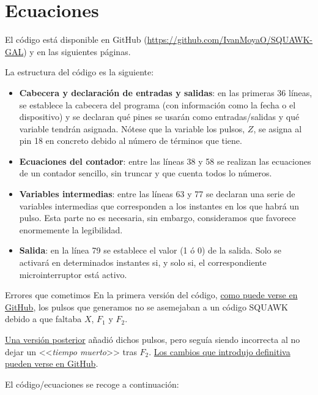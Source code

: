 \section*{Ecuaciones}
El código está disponible en GitHub (\textcolor{blue}{\href{https://github.com/IvanMoyaO/SQUAWK-GAL}{https://github.com/IvanMoyaO/SQUAWK-GAL}}) y en las siguientes páginas. 

La estructura del código es la siguiente:
\begin{itemize}
    \item \textbf{Cabecera y declaración de entradas y salidas}: en las primeras 36 líneas, se establece la cabecera del programa (con información como la fecha o el dispositivo) y se declaran qué pines se usarán como entradas/salidas y qué variable tendrán asignada. Nótese que la variable los pulsos, $Z$, se asigna al pin 18 en concreto debido al número de términos que tiene.
    \item \textbf{Ecuaciones del contador}: entre las líneas 38 y 58 se realizan las ecuaciones de un contador sencillo, sin truncar y que cuenta todos lo números.
    \item \textbf{Variables intermedias}: entre las líneas 63 y 77 se declaran una serie de variables intermedias que corresponden a los instantes en los que habrá un pulso. Esta parte no es necesaria, sin embargo, consideramos que favorece enormemente la legibilidad.
    \item \textbf{Salida}: en la línea 79 se establece el valor (1 ó 0) de la salida. Solo se activará en determinados instantes si, y solo si, el correspondiente microinterruptor está activo.
\end{itemize}

\begin{cuidado}{Errores que cometimos}
En la primera versión del código, \textcolor{blue}{\href{https://github.com/IvanMoyaO/SQUAWK-GAL/commit/ac02036bc24f1b977cd46d78ace5171c46c0033c}{como puede verse en GitHub}}, los pulsos que generamos no se asemejaban a un código SQUAWK debido a que faltaba $X$, $F_1$ y $F_2$.

\textcolor{blue}{\href{https://github.com/IvanMoyaO/SQUAWK-GAL/commit/d1294f0a59ebac4c123ad7443a96185edbf2dbca}{Una versión posterior}} añadió dichos pulsos, pero seguía siendo incorrecta al no dejar un <<\textit{tiempo muerto}>> tras $F_2$. \textcolor{blue}{\href{https://github.com/IvanMoyaO/SQUAWK-GAL/commit/8cf73270ac348ffd79384d2d9c017e38601c2216}{Los cambios que introdujo definitiva pueden verse en GitHub}}.

\end{cuidado}

El código/ecuaciones se recoge a continuación:

\lstset{inputencoding=utf8/latin1}


